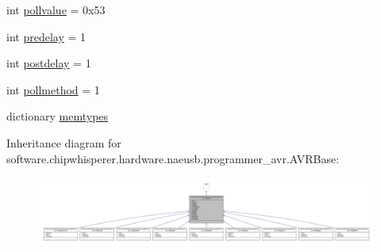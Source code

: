 \begin{DoxyCompactItemize}
int \hyperlink{classsoftware_1_1chipwhisperer_1_1hardware_1_1naeusb_1_1programmer__avr_1_1AVRBase_ac542b4a1971547756a519009ba22e9c2}{pollvalue} = 0x53
\item 
int \hyperlink{classsoftware_1_1chipwhisperer_1_1hardware_1_1naeusb_1_1programmer__avr_1_1AVRBase_a01277f8dbb2100667fbf97102b19ebf6}{predelay} = 1
\item 
int \hyperlink{classsoftware_1_1chipwhisperer_1_1hardware_1_1naeusb_1_1programmer__avr_1_1AVRBase_aad5d0a8059093fb5067506a00d48fbb8}{postdelay} = 1
\item 
int \hyperlink{classsoftware_1_1chipwhisperer_1_1hardware_1_1naeusb_1_1programmer__avr_1_1AVRBase_a3739cf95fc9f0d705f417f852aa46499}{pollmethod} = 1
\item 
dictionary \hyperlink{classsoftware_1_1chipwhisperer_1_1hardware_1_1naeusb_1_1programmer__avr_1_1AVRBase_a065728e535a001c7fbd3bf3215a16806}{memtypes}
\end{DoxyCompactItemize}


Inheritance diagram for software.\+chipwhisperer.\+hardware.\+naeusb.\+programmer\+\_\+avr.\+A\+V\+R\+Base\+:\nopagebreak
\begin{figure}[H]
\begin{center}
\leavevmode
\includegraphics[width=350pt]{dd/dc3/classsoftware_1_1chipwhisperer_1_1hardware_1_1naeusb_1_1programmer__avr_1_1AVRBase__inherit__graph}
\end{center}
\end{figure}


